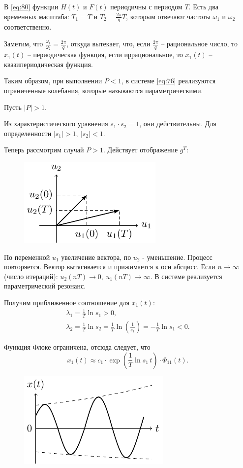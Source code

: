 В \eqref{eq:80} функции  $H(t)$ и $F(t)$ периодичны с периодом $T$. Есть два временных масштаба: $T_1=T$ и $T_2=\frac{2\pi}{q}T$, которым отвечают частоты $\omega_1$ и $\omega_2$ соответственно.

Заметим, что $\frac{\omega_1}{\omega_2}=\frac{2\pi}{q}$, откуда вытекает, что, если $\frac{2\pi}{q}$ -- рациональное число, то $x_1(t)$ -- периодическая функция, если иррациональное, то $x_1(t)$ -- квазипериодическая функция. 

Таким образом, при выполнении $P<1$, в системе \eqref{eq:76} реализуются ограниченные колебания, которые называются параметрическими.

Пусть $|P|>1$.

Из характеристического уравнения $s_1 \cdot s_2=1$, они действительны. Для определенности $|s_1|>1,~ |s_2|<1$.

Теперь рассмотрим случай $P>1$. Действует отображение $g^T$:
\begin{figure}[H]
	\centering
	\includegraphics[scale=1.5]{img/parametric_oscillations/Pbigger}  
\end{figure}

По переменной $u_1$ увеличение вектора, по $u_2$ - уменьшение. Процесс повторяется. Вектор вытягивается и прижимается к оси абсцисс. Если $n\rightarrow \infty$ (число итераций): $u_2(nT)\rightarrow 0,~u_1(nT)\rightarrow \infty$. В системе реализуется параметрический резонанс. 

Получим приближенное соотношение для $x_1(t)$:
\begin{gather*}
	\lambda_1=\frac{1}{T}\ln s_1 >0, \\
	\lambda_2=\frac{1}{T}\ln s_2=\frac{1}{T}\ln(\frac{1}{s_1})=-\frac{1}{T}\ln s_1 <0.
\end{gather*}

Функция Флоке ограничена, отсюда следует, что
\begin{equation*}
	x_1(t)\approx c_1\cdot\exp(\frac{1}{T}\ln s_1 \, t)\cdot\Phi_{11}(t).
\end{equation*}
\begin{figure}[H]
	\centering
	\includegraphics[scale=1.5]{img/parametric_oscillations/x_t}  
\end{figure}

